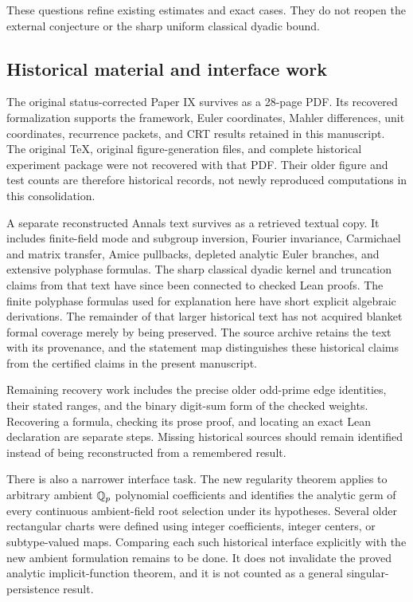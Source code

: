 These questions refine existing estimates and exact cases. They do not reopen
the external conjecture or the sharp uniform classical dyadic bound.

\subsection{Historical material and interface work}
\label{subsec:historical-scope}

The original status-corrected Paper IX survives as a 28-page PDF. Its recovered
formalization supports the framework, Euler coordinates, Mahler differences,
unit coordinates, recurrence packets, and CRT results retained in this
manuscript. The original TeX, original figure-generation files, and complete
historical experiment package were not recovered with that PDF. Their older
figure and test counts are therefore historical records, not newly reproduced
computations in this consolidation.

A separate reconstructed Annals text survives as a retrieved textual copy.
It includes finite-field mode and subgroup inversion, Fourier invariance,
Carmichael and matrix transfer, Amice pullbacks, depleted analytic Euler
branches, and extensive polyphase formulas. The sharp classical dyadic kernel
and truncation claims from that text have since been connected to checked
Lean proofs. The finite polyphase formulas used for explanation here have
short explicit algebraic derivations. The remainder of that larger historical
text has not acquired blanket formal coverage merely by being preserved.
The source archive retains the text with its provenance, and the statement
map distinguishes these historical claims from the certified claims in the
present manuscript.

Remaining recovery work includes the precise older odd-prime edge identities,
their stated ranges, and the binary digit-sum form of the checked weights.
Recovering a formula, checking its prose proof, and locating an exact Lean
declaration are separate steps. Missing historical sources should remain
identified instead of being reconstructed from a remembered result.

There is also a narrower interface task. The new regularity theorem applies to
arbitrary ambient $\mathbb Q_p$ polynomial coefficients and identifies the analytic
germ of every continuous ambient-field root selection under its hypotheses.
Several older rectangular charts were defined using integer coefficients,
integer centers, or subtype-valued maps. Comparing each such historical
interface explicitly with the new ambient formulation remains to be done.
It does not invalidate the proved analytic implicit-function theorem, and it
is not counted as a general singular-persistence result.
